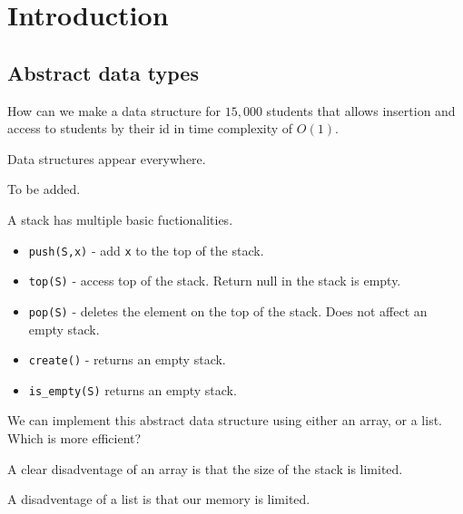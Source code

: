 \documentclass[11pt,a4paper]{article}
\begin{document}
\maketitle


\newpage
\tableofcontents
\newpage

\section{Introduction}

\subsection{Abstract data types}

\begin{example}
	How can we make a data structure for $15,\!000$ students
	that allows insertion and access to students by their id
	in time complexity of $O(1)$.
\end{example}

Data structures appear everywhere.

\begin{definition}
    To be added.
\end{definition}

\begin{example}[Stack]
    A stack has multiple basic fuctionalities.
    \begin{itemize}
        \item \texttt{push(S,x)} - add \texttt x to the top of the stack.
        \item \texttt{top(S)} - access top of the stack. Return null
            in the stack is empty.
        \item \texttt{pop(S)} - deletes the element on the top of the
            stack. Does not affect an empty stack.
        \item \texttt{create()} - returns an empty stack.
        \item \texttt{is\_empty(S)} returns an empty stack.
    \end{itemize}
\end{example}

We can implement this abstract data structure using either
an array, or a list. Which is more efficient?

A clear disadventage of an array is that the size of the
stack is limited.

A disadventage of a list is that our memory is limited.
\end{document}
